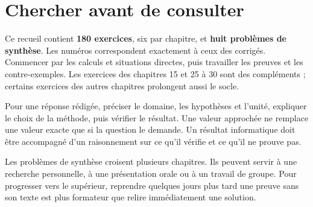 
\chapter*{Chercher avant de consulter}
Ce recueil contient \textbf{180 exercices}, six par chapitre, et \textbf{huit
problèmes de synthèse}. Les numéros correspondent exactement à ceux des corrigés.
Commencer par les calculs et situations directes, puis travailler les preuves
et les contre-exemples. Les exercices des chapitres 15 et 25 à 30 sont des
compléments ; certains exercices des autres chapitres prolongent aussi le socle.

Pour une réponse rédigée, préciser le domaine, les hypothèses et l'unité,
expliquer le choix de la méthode, puis vérifier le résultat. Une valeur approchée
ne remplace une valeur exacte que si la question le demande.
Un résultat informatique doit être accompagné d'un raisonnement sur ce qu'il
vérifie et ce qu'il ne prouve pas.

Les problèmes de synthèse croisent plusieurs chapitres. Ils peuvent servir
à une recherche personnelle, à une présentation orale ou à un travail de groupe.
Pour progresser vers le supérieur, reprendre quelques jours plus tard une preuve
sans son texte est plus formateur que relire immédiatement une solution.
